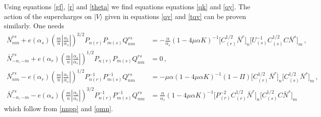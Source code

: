 \documentclass[12pt]{article}
\def\a{\alpha}
\def\m{\mu}
\def\ra{\rangle}
\numberwithin{equation}{section} \setlength{\textwidth}{17cm}
\begin{document}
Using equations \eqref{gf}, \eqref{r} and \eqref{theta} we find equations
equations \eqref{qk} and \eqref{qy}. The action of the supercharges on $|V\ra$ given in equations
\eqref{qv} and \eqref{tqv} can be proven similarly. One needs
\begin{equation}
\begin{split}
\bar{N}^{rs}_{nm}+e(\a_s)\left(\frac{m}{n}\left|\frac{\a_r}{\a_s}\right|\right)^{3/2}
P_{n(r)}P_{m(s)}Q^{rs}_{nm} & = -\frac{\a}{\a_s}(1-4\m\a K)^{-1}
\bigl[C_{(r)}^{1/2}\bar{N}^r\bigr]_n\bigl[U_{(s)}^{-1}C_{(s)}^{1/2}C\bar{N}^s\bigr]_m\,,\\
\bar{N}^{rs}_{-n,-m}+e(\a_r)\left(\frac{m}{n}\left|\frac{\a_r}{\a_s}\right|\right)^{1/2}P_{n(r)}P_{m(s)}Q^{rs}_{nm} & 
= 0\,,
\end{split}
\end{equation}
\begin{equation}
\begin{split}
\bar{N}^{rs}_{nm}-e(\a_r)\left(\frac{m}{n}\left|\frac{\a_r}{\a_s}\right|\right)^{1/2}P_{n(r)}^{-1}P_{m(s)}^{-1}Q^{rs}_{nm} & =
-\m\a(1-4\m\a K)^{-1}(1-\Pi)\bigl[C_{(r)}^{1/2}\bar{N}^r\bigr]_n\bigl[C_{(s)}^{1/2}\bar{N}^s\bigr]_m\,,\\
\bar{N}^{rs}_{-n,-m}-e(\a_s)\left(\frac{m}{n}\left|\frac{\a_r}{\a_s}\right|\right)^{3/2}P_{n(r)}^{-1}P_{m(s)}^{-1}Q^{rs}_{nm} & =
\frac{\a}{\a_s}(1-4\m\a K)^{-1}
\bigl[P^{-2}_{(r)}C_{(r)}^{1/2}\bar{N}^r\bigr]_n\bigl[C_{(s)}^{1/2}C\bar{N}^s\bigr]_m
\end{split}
\end{equation}
which follow from \eqref{nnpp} and \eqref{qmn}.
\end{document}
